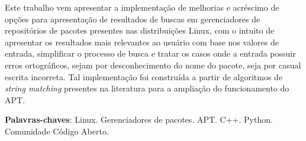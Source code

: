 \begin{resumo}

    

Este trabalho vem apresentar a implementação de melhorias e acréscimo de opções para  apresentação de resultados de buscas em gerenciadores de repositórios de pacotes presentes nas distribuições Linux, com o intuito de apresentar os resultados mais relevantes ao usuário com base nos valores de entrada, simplificar o processo de busca e tratar os casos onde a entrada possuir erros ortográficos, sejam por desconhecimento do nome do pacote, seja por casual escrita incorreta. Tal implementação foi construída a partir de algoritmos de \textit{string matching} presentes na literatura para a ampliação do funcionamento do APT.

 \vspace{\onelineskip}
    
 \noindent
 \textbf{Palavras-chaves}: Linux. Gerenciadores de pacotes. APT. C++. Python. Comunidade Código Aberto.
\end{resumo}
